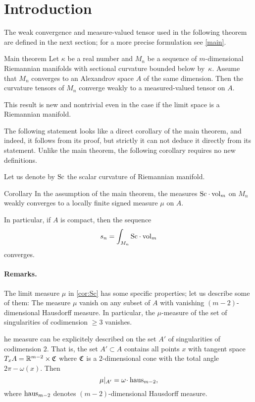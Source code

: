 \section{Introduction}

The weak convergence and measure-valued tensor used in the following theorem are defined in the next section;
for a more precise formulation see \ref{main}.

\begin{thm}{Main theorem}
Let $\kappa$ be a real number and 
$M_n$ be a sequence of $m$-dimensional Riemannian manifolds with sectional curvature bounded below by~$\kappa$.
Assume that $M_n$ converges to an Alexandrov space $A$ of the same dimension.
Then the curvature tensors of $M_n$ converge weakly to a measured-valued tensor on $A$.
\end{thm}

This result is new and nontrivial even in the case if the limit space is a Riemannian manifold.


The following statement looks like a direct corollary of the main theorem, 
and indeed, it follows from its proof, but strictly it can not deduce it directly from its statement.
Unlike the main theorem, the following corollary requires no new definitions.
 
Let us denote by $\operatorname{Sc}$ the scalar curvature of Riemannian manifold.


\begin{thm}{Corollary}\label{cor:Sc}
In the assumption of the main theorem,
the measures $\Sc\cdot \vol_m$ on $M_n$ weakly converges to a locally finite signed measure $\mu$  on $A$.

In particular, if $A$ is compact, then the sequence
\[s_n=\int_{M_n}\Sc \cdot\vol_m\]
converges.
\end{thm}


\paragraph{Remarks.}
The limit measure $\mu$ in \ref{cor:Sc} has some specific properties;
let us describe some of them:
The measure $\mu$ vanish on any subset of $A$ with vanishing $(m-2)$-dimensional Hausdorff measure.
In particular, the $\mu$-measure of the set of singularities
of codimension $\ge 3$ vanishes.

he measure can be explicitely described 
on the set $A'$ of singularities
of codimension $2$. That is, the set $A'\subset A$
contains all points $x$ with tangent space
$T_xA=\mathbb{R}^{m-2}\times \mathfrak{C}$
where $\mathfrak{C}$ is a $2$-dimensional cone
with the total angle $2\pi-\omega(x)$.
Then 
$$\mu|_{A'}=\omega\cdot \haus_{m-2},$$
where $\operatorname{\rm haus}_{m-2}$ denotes $(m-2)$-dimensional Hausdorff measure.



